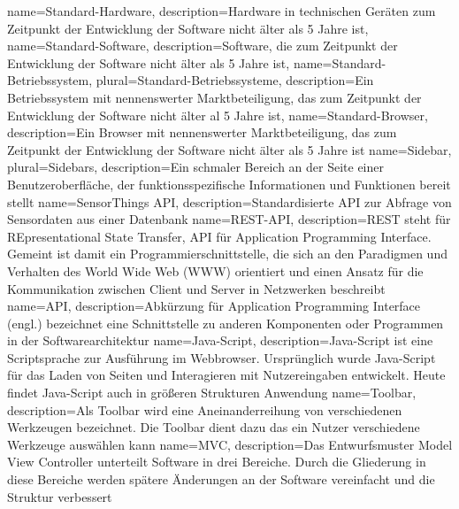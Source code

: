 {
	name=Standard-Hardware,
	description={Hardware in technischen Geräten zum Zeitpunkt der Entwicklung der Software nicht älter als 5 Jahre ist},
}
{
	name=Standard-Software,
	description={Software, die zum Zeitpunkt der Entwicklung der Software nicht älter als 5 Jahre ist},
}
{
	name=Standard-Betriebssystem,
	plural=Standard-Betriebssysteme,
	description={Ein Betriebssystem mit nennenswerter Marktbeteiligung, das zum Zeitpunkt der Entwicklung der Software nicht älter al 5 Jahre ist},
}
{
	name=Standard-Browser,
	description={Ein Browser mit nennenswerter Marktbeteiligung, das zum Zeitpunkt der Entwicklung der Software nicht älter als 5 Jahre ist}
}
{
	name=Sidebar,
	plural=Sidebars,
	description={Ein schmaler Bereich an der Seite einer Benutzeroberfläche, der funktionsspezifische Informationen und Funktionen bereit stellt}
}
{
	name=SensorThings \gls{API},
	description={Standardisierte \gls{API} zur Abfrage von \gls{Sensor}daten aus einer Datenbank}
}
{
	name=REST-\gls{API},
	description={REST steht für REpresentational State Transfer, API für Application Programming Interface. Gemeint ist damit ein Programmierschnittstelle, die sich an den Paradigmen und Verhalten des World Wide Web (WWW) orientiert und einen Ansatz für die Kommunikation zwischen Client und Server in Netzwerken beschreibt}
}
{
	name=API,
	description={Abkürzung für Application Programming Interface (engl.) bezeichnet eine Schnittstelle zu anderen Komponenten oder Programmen in der Softwarearchitektur}
}
{
	name=Java-Script,
	description={Java-Script ist eine Scriptsprache zur Ausführung im Webbrowser. Ursprünglich wurde Java-Script für das Laden von Seiten und Interagieren mit Nutzereingaben entwickelt. Heute findet Java-Script auch in größeren Strukturen Anwendung}
}
{
	name=Toolbar,
	description={Als Toolbar wird eine Aneinanderreihung von verschiedenen Werkzeugen bezeichnet. Die Toolbar dient dazu das ein Nutzer verschiedene Werkzeuge auswählen kann}
}
{
	name=MVC,
	description={Das Entwurfsmuster Model View Controller unterteilt Software in drei Bereiche. Durch die Gliederung in diese Bereiche werden spätere Änderungen an der Software vereinfacht und die Struktur verbessert}
}
